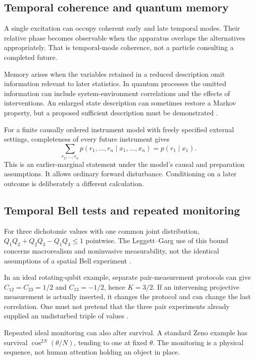 \documentclass[11pt,a4paper]{article}
\begin{document}
\subsection{Temporal coherence and quantum memory}
A single excitation can occupy coherent early and late temporal modes. Their relative phase becomes observable when the apparatus overlaps the alternatives appropriately. That is temporal-mode coherence, not a particle consulting a completed future.

Memory arises when the variables retained in a reduced description omit information relevant to later statistics. In quantum processes the omitted information can include system-environment correlations and the effects of interventions. An enlarged state description can sometimes restore a Markov property, but a proposed sufficient description must be demonstrated \cite{Pollock}.

For a finite causally ordered instrument model with freely specified external settings, completeness of every future instrument gives
\begin{equation}
\sum_{r_2,\ldots,r_n}p(r_1,\ldots,r_n\mid x_1,\ldots,x_n)
=p(r_1\mid x_1).
\end{equation}
This is an earlier-marginal statement under the model's causal and preparation assumptions. It allows ordinary forward disturbance. Conditioning on a later outcome is deliberately a different calculation.

\subsection{Temporal Bell tests and repeated monitoring}
For three dichotomic values with one common joint distribution,
\(Q_1Q_2+Q_2Q_3-Q_1Q_3\leq1\) pointwise. The Leggett--Garg use of this bound concerns macrorealism and noninvasive measurability, not the identical assumptions of a spatial Bell experiment \cite{LeggettGarg}.

In an ideal rotating-qubit example, separate pair-measurement protocols can give \(C_{12}=C_{23}=1/2\) and \(C_{13}=-1/2\), hence \(K=3/2\). If an intervening projective measurement is actually inserted, it changes the protocol and can change the last correlation. One must not pretend that the three pair experiments already supplied an undisturbed triple of values \cite{NeroTemporal}.

Repeated ideal monitoring can also alter survival. A standard Zeno example has survival \(\cos^{2N}(\theta/N)\), tending to one at fixed \(\theta\). The monitoring is a physical sequence, not human attention holding an object in place.
\end{document}
